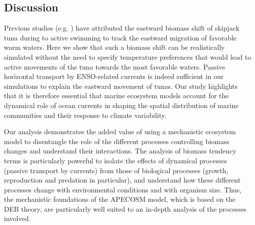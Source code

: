 
\subsection{Discussion}

Previous studies (e.g. \citealp{lehodeyNinoSouthernOscillation1997, lehodeyPelagicEcosystemTropical2001}) have attributed the eastward biomass shift of skipjack tuna during \nino{} to active swimming to track the eastward migration of favorable warm waters. Here we show that such a biomass shift can be realistically simulated without the need to specify temperature preferences that would lead to active movements of the tuna towards the most favorable waters. Passive horizontal transport by ENSO-related currents is indeed sufficient in our simulations to explain the eastward movement of tunas. Our study highlights that it is therefore essential that marine ecosystem models account for the dynamical role of ocean currents in shaping the spatial distribution of marine communities and their response to climate variability.

Our analysis demonstrates the added value of using a mechanistic ecosystem model to disentangle the role of the different processes controlling biomass changes and understand their interactions. The analysis of biomass tendency terms is particularly powerful to isolate the effects of dynamical processes (passive transport by currents) from those of biological processes (growth, reproduction and predation in particular), and understand how these different processes change with environmental conditions and with organism size. Thus, the mechanistic foundations of the APECOSM model, which is based on the DEB theory, are particularly well suited to an in-depth analysis of the processes involved.

